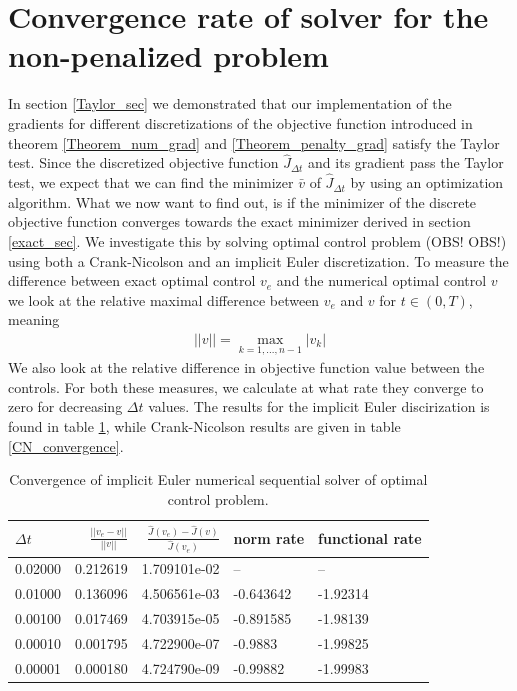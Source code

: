 \section{Convergence rate of solver for the non-penalized problem}
In section \ref{Taylor_sec} we demonstrated that our implementation of the gradients for different discretizations of the objective function introduced in theorem \ref{Theorem_num_grad} and \ref{Theorem_penalty_grad} satisfy the Taylor test. Since the discretized objective function $\hat J_{\Delta t}$ and its gradient pass the Taylor test, we expect that we can find the minimizer $\bar v$ of $\hat J_{\Delta t}$ by using an optimization algorithm. What we now want to find out, is if the minimizer of the discrete objective function converges towards the exact minimizer derived in section \ref{exact_sec}. We investigate this by solving optimal control problem (OBS! OBS!) using both a Crank-Nicolson and an implicit Euler discretization. To measure the difference between exact optimal control $v_e$ and the numerical optimal control $v$ we look at the relative maximal difference between $v_e$ and $v$ for $t\in(0,T)$, meaning
\begin{align}
||v|| = \max_{k=1,...,n-1}|v_k| \label{inner_norm}
\end{align} 
We also look at the relative difference in objective function value between the controls. For both these measures, we calculate at what rate they converge to zero for decreasing $\Delta t$ values. The results for the implicit Euler discirization is found in table \ref{IE_convergence}, while Crank-Nicolson results are given in table \ref{CN_convergence}.
\begin{table}[h]
\caption{Convergence of implicit Euler numerical sequential solver of optimal control problem.}\label{IE_convergence}
\centering
\begin{tabular}{lrrll}
\toprule
{} $\Delta t$&    $\frac{||v_e-v||}{||v||}$ &  $\frac{\hat J(v_e)-\hat J(v)}{\hat J(v_e)}$ &   norm rate &    functional rate \\
\midrule
0.02000 &  0.212619 &  1.709101e-02 &        -- &       -- \\
0.01000 &  0.136096 &  4.506561e-03 & -0.643642 & -1.92314 \\
0.00100 &  0.017469 &  4.703915e-05 & -0.891585 & -1.98139 \\
0.00010 &  0.001795 &  4.722900e-07 &   -0.9883 & -1.99825 \\
0.00001 &  0.000180 &  4.724790e-09 &  -0.99882 & -1.99983 \\
\bottomrule
\end{tabular}
\end{table}
